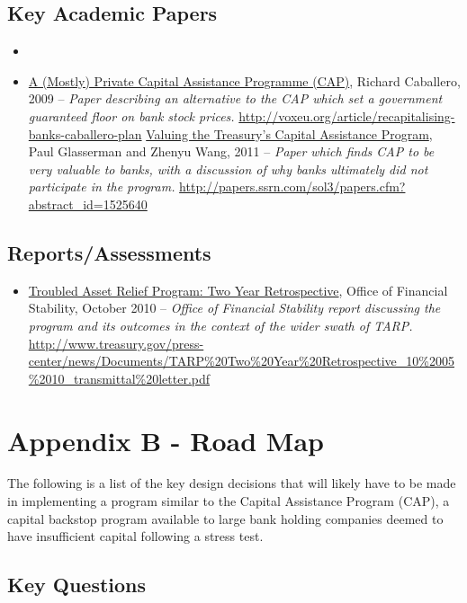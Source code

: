 \documentclass[12pt]{article}
\begin{document}
\subsection{Key Academic Papers}

\begin{itemize}
\item
\item
\ul{A (Mostly) Private Capital Assistance Programme
(CAP)},
Richard Caballero, 2009 -- \emph{Paper describing an alternative to the CAP which set a government guaranteed floor on bank stock prices.} \url{http://voxeu.org/article/recapitalising-banks-caballero-plan}
\ul{Valuing the Treasury's Capital Assistance Program},
Paul Glasserman and Zhenyu Wang, 2011 -- \emph{Paper
which finds CAP to be very valuable to banks, with a discussion of why banks ultimately did not participate in the program.} \url{http://papers.ssrn.com/sol3/papers.cfm?abstract_id=1525640}
\end{itemize}

\subsection{Reports/Assessments}

\begin{itemize}
\item
\ul{Troubled
 Asset Relief Program: Two Year Retrospective}, Office of Financial
 Stability, October 2010 -- \emph{Office of Financial Stability report
 discussing the program and its outcomes in the context of the wider
 swath of TARP.} \url{http://www.treasury.gov/press-center/news/Documents/TARP\%20Two\%20Year\%20Retrospective_10\%2005\%2010_transmittal\%20letter.pdf}
\end{itemize}

\section{Appendix B - Road Map}

The following is a list of the key design decisions that will likely have to be made in implementing a program similar to the Capital Assistance Program (CAP), a capital backstop program available to large bank holding companies deemed to have insufficient capital following a stress test.

\subsection{Key Questions}
\end{document}
